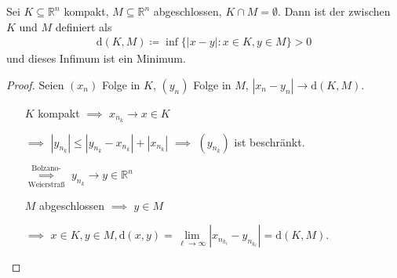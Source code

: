 \begin{theorem}[Satz] \label{thm:10.3}
  Sei $K \subseteq \mathbb{R}^n$ kompakt, $M \subseteq \mathbb{R}^n$ abgeschlossen, $K \cap M = \emptyset$. Dann ist der  zwischen $K$ und $M$ definiert als
  \begin{align*}
    \mathrm{d}(K,M) \coloneq \inf \{ |x-y| : x \in K, y \in M \} > 0
  \end{align*}
  und dieses Infimum ist ein Minimum.
  
  \begin{proof}
    Seien $(x_n)$ Folge in $K$, $(y_n)$ Folge in $M$, $|x_n-y_n| \to \mathrm{d}(K,M)$.
    \begin{itemize}
      \item[] $K$ kompakt $\implies$ $x_{n_k} \to x \in K$
      
      \item[$\implies$] $|y_{n_k}| \leq |y_{n_k} - x_{n_k}| + |x_{n_k}|$ $\implies$ $(y_{n_k})$ ist beschränkt.
      
      \item[$\overset{\text{Bolzano-}}{\underset{\text{Weierstraß}}{\implies}}$] $y_{n_k} \to y \in \mathbb{R}^n$
      
      \item[] $M$ abgeschlossen $\implies$ $y \in M$
      
      \item[$\implies$] $x \in K , y \in M, \mathrm{d}(x,y) = \lim\limits_{\ell \to \infty}|x_{n_{k_\ell}} - y_{n_{k_\ell}}| = \mathrm{d}(K,M)$.
    \end{itemize}
  \end{proof}
\end{theorem}

